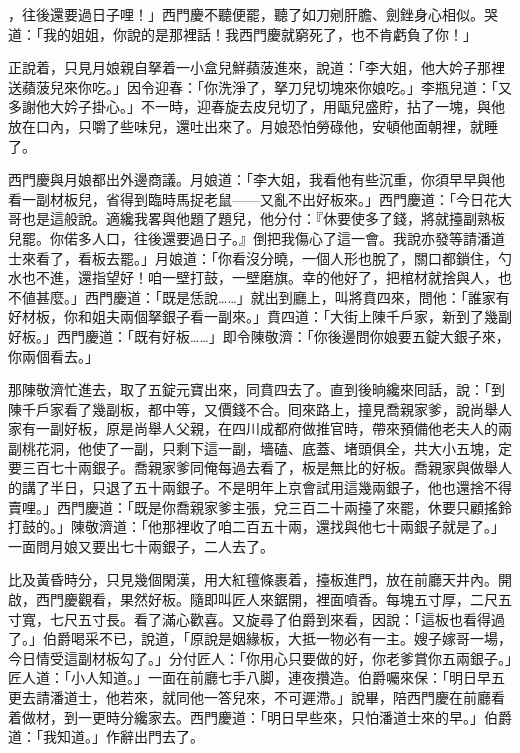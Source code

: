 ，往後還要過日子哩！」{}西門慶不聽便罷，聽了如刀剜肝膽、劍銼身心相似。哭道：「我的姐姐，你說的是那裡話！我西門慶就窮死了，也不肯虧負了你！」

正說着，只見月娘親自拏着一小盒兒鮮蘋菠進來，說道：「李大姐，他大妗子那裡送蘋菠兒來你吃。」因令迎春：「你洗淨了，拏刀兒切塊來你娘吃。」李瓶兒道：「又多謝他大妗子掛心。」不一時，迎春旋去皮兒切了，用甌兒盛貯，拈了一塊，與他放在口內，只嚼了些味兒，還吐出來了。月娘恐怕勞碌他，安頓他面朝裡，就睡了。

西門慶與月娘都出外邊商議。月娘道：「李大姐，我看他有些沉重，你須早早與他看一副材板兒，省得到臨時馬捉老鼠——又亂不出好板來。」西門慶道：「今日花大哥也是這般說。適纔我畧與他題了題兒，他分付：『休要使多了錢，將就擡副熟板兒罷。你偌多人口，往後還要過日子。』倒把我傷心了這一會。我說亦發等請潘道士來看了，看板去罷。」{}月娘道：「你看沒分曉，一個人形也脫了，關口都鎖住，勺水也不進，還指望好！咱一壁打鼓，一壁磨旗。幸的他好了，把棺材就捨與人，也不値甚麼。」西門慶道：「既是恁說……」就出到廳上，叫將賁四來，問他：「誰家有好材板，你和姐夫兩個拏銀子看一副來。」賁四道：「大街上陳千戶家，新到了幾副好板。」西門慶道：「既有好板……」即令陳敬濟：「你後邊問你娘要五錠大銀子來，你兩個看去。」

那陳敬濟忙進去，取了五錠元寶出來，同賁四去了。直到後晌纔來囘話，說：「到陳千戶家看了幾副板，都中等，又價錢不合。囘來路上，撞見喬親家爹，說尚舉人家有一副好板，原是尚舉人父親，在四川成都府做推官時，帶來預備他老夫人的兩副桃花洞，他使了一副，只剩下這一副，墻磕、底蓋、堵頭俱全，共大小五塊，定要三百七十兩銀子。喬親家爹同俺每過去看了，板是無比的好板。喬親家與做舉人的講了半日，只退了五十兩銀子。不是明年上京會試用這幾兩銀子，他也還捨不得賣哩。」西門慶道：「既是你喬親家爹主張，兌三百二十兩擡了來罷，休要只顧搖鈴打鼓的。」陳敬濟道：「他那裡收了咱二百五十兩，還找與他七十兩銀子就是了。」一面問月娘又要出七十兩銀子，二人去了。

比及黃昏時分，只見幾個閑漢，用大紅氊條裹着，擡板進門，放在前廳天井內。開啟，西門慶觀看，果然好板。隨即叫匠人來鋸開，裡面噴香。每塊五寸厚，二尺五寸寬，七尺五寸長。看了滿心歡喜。又旋尋了伯爵到來看，因說：「這板也看得過了。」伯爵喝采不已，說道，「原說是姻緣板，大抵一物必有一主。嫂子嫁哥一場，今日情受這副材板勾了。」分付匠人：「你用心只要做的好，你老爹賞你五兩銀子。」匠人道：「小人知道。」一面在前廳七手八脚，連夜攢造。伯爵囑來保：「明日早五更去請潘道士，他若來，就同他一答兒來，不可遲滯。」說畢，陪西門慶在前廳看着做材，到一更時分纔家去。西門慶道：「明日早些來，只怕潘道士來的早。」伯爵道：「我知道。」作辭出門去了。

